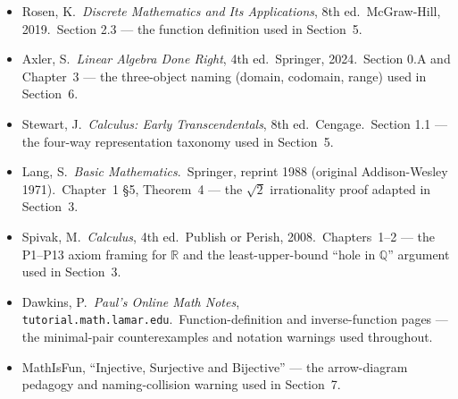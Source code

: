 \begin{itemize}
  \item Rosen, K.\ \textit{Discrete Mathematics and Its Applications}, 8th ed.\ McGraw-Hill, 2019.\ Section 2.3 --- the function definition used in Section~5.
  \item Axler, S.\ \textit{Linear Algebra Done Right}, 4th ed.\ Springer, 2024.\ Section 0.A and Chapter~3 --- the three-object naming (domain, codomain, range) used in Section~6.
  \item Stewart, J.\ \textit{Calculus: Early Transcendentals}, 8th ed.\ Cengage.\ Section 1.1 --- the four-way representation taxonomy used in Section~5.
  \item Lang, S.\ \textit{Basic Mathematics}.\ Springer, reprint 1988 (original Addison-Wesley 1971).\ Chapter~1 \S5, Theorem~4 --- the $\sqrt{2}$ irrationality proof adapted in Section~3.
  \item Spivak, M.\ \textit{Calculus}, 4th ed.\ Publish or Perish, 2008.\ Chapters~1--2 --- the P1--P13 axiom framing for $\mathbb{R}$ and the least-upper-bound ``hole in $\mathbb{Q}$'' argument used in Section~3.
  \item Dawkins, P.\ \textit{Paul's Online Math Notes}, \texttt{tutorial.math.lamar.edu}.\ Function-definition and inverse-function pages --- the minimal-pair counterexamples and notation warnings used throughout.
  \item MathIsFun, ``Injective, Surjective and Bijective'' --- the arrow-diagram pedagogy and naming-collision warning used in Section~7.
\end{itemize}


